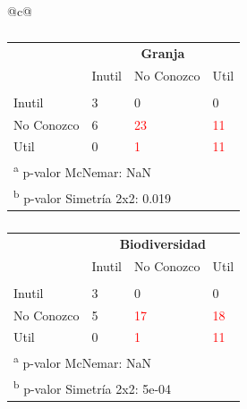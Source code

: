 \documentclass[a4paper, nobind]{templates/ociamthesis}
\begin{document}
\begin{table}[hbtp]
\begin{threeparttable}
\begin{tabular}{@{}c@{}}
\begin{minipage}{\textwidth}
\begin{subtable}[b]{0.4\textwidth}
\begin{tabular}{llll}
\toprule
\multicolumn{1}{c}{\textbf{ }} & \multicolumn{3}{c}{\textbf{Granja}} \\
  & Inutil & No Conozco & Util\\
\midrule
\addlinespace[0.3em]
\multicolumn{4}{l}{\textbf{Nitratos}}\\
\hspace{1em}Inutil & 3 & 0 & 0\\
\hspace{1em}No Conozco & 6 & \textcolor{red}{23} & \textcolor{red}{11}\\
\hspace{1em}Util & 0 & \textcolor{red}{1} & \textcolor{red}{11}\\
\bottomrule
\multicolumn{4}{l}{\textsuperscript{a} p-valor McNemar: NaN}\\
\multicolumn{4}{l}{\textsuperscript{b} p-valor Simetría 2x2: 0.019}\\
\end{tabular}
        \caption{}
        \label{tab:nitratos-granja}
        \end{subtable}
\hfill
        \begin{subtable}[b]{0.4\textwidth}

\begin{tabular}{llll}
\toprule
\multicolumn{1}{c}{\textbf{ }} & \multicolumn{3}{c}{\textbf{Biodiversidad}} \\
  & Inutil & No Conozco & Util\\
\midrule
\addlinespace[0.3em]
\multicolumn{4}{l}{\textbf{Nitratos}}\\
\hspace{1em}Inutil & 3 & 0 & 0\\
\hspace{1em}No Conozco & 5 & \textcolor{red}{17} & \textcolor{red}{18}\\
\hspace{1em}Util & 0 & \textcolor{red}{1} & \textcolor{red}{11}\\
\bottomrule
\multicolumn{4}{l}{\textsuperscript{a} p-valor McNemar: NaN}\\
\multicolumn{4}{l}{\textsuperscript{b} p-valor Simetría 2x2: 5e-04}\\
\end{tabular}
        \caption{}
        \label{tab:nitratos-biodiversidad}
        \end{subtable}
\hfill
        \begin{subtable}[c]{\textwidth}
\centering


\end{subtable}
\end{minipage}
\end{tabular}
\end{threeparttable}
\end{table}
\end{document}
